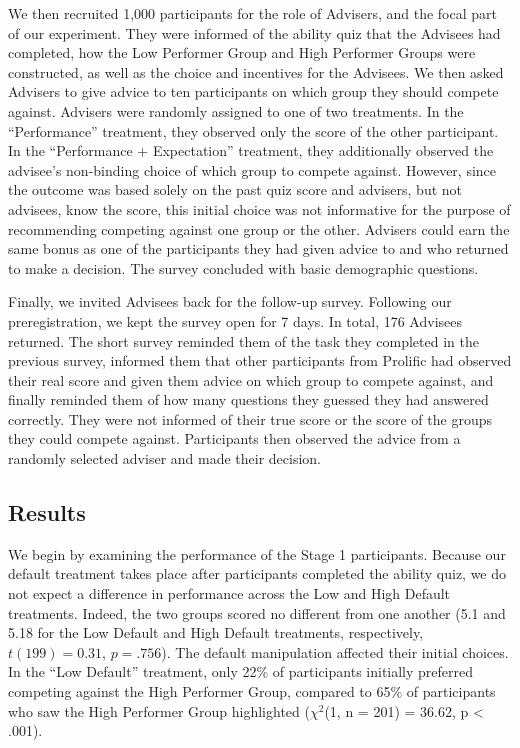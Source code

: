 \documentclass[
  man,
  floatsintext,
  longtable,
  nolmodern,
  notxfonts,
  notimes,
  colorlinks=true,linkcolor=blue,citecolor=blue,urlcolor=blue]{apa7}
\begin{document}
We then recruited 1,000 participants for the role of Advisers, and the
focal part of our experiment. They were informed of the ability quiz
that the Advisees had completed, how the Low Performer Group and High
Performer Groups were constructed, as well as the choice and incentives
for the Advisees. We then asked Advisers to give advice to ten
participants on which group they should compete against. Advisers were
randomly assigned to one of two treatments. In the ``Performance''
treatment, they observed only the score of the other participant. In the
``Performance + Expectation'' treatment, they additionally observed the
advisee's non-binding choice of which group to compete against. However,
since the outcome was based solely on the past quiz score and advisers,
but not advisees, know the score, this initial choice was not
informative for the purpose of recommending competing against one group
or the other. Advisers could earn the same bonus as one of the
participants they had given advice to and who returned to make a
decision. The survey concluded with basic demographic questions.

Finally, we invited Advisees back for the follow-up survey. Following
our preregistration, we kept the survey open for 7 days. In total, 176
Advisees returned. The short survey reminded them of the task they
completed in the previous survey, informed them that other participants
from Prolific had observed their real score and given them advice on
which group to compete against, and finally reminded them of how many
questions they guessed they had answered correctly. They were not
informed of their true score or the score of the groups they could
compete against. Participants then observed the advice from a randomly
selected adviser and made their decision.

\subsection{Results}\label{results}

We begin by examining the performance of the Stage 1 participants.
Because our default treatment takes place after participants completed
the ability quiz, we do not expect a difference in performance across
the Low and High Default treatments. Indeed, the two groups scored no
different from one another (5.1 and 5.18 for the Low Default and High
Default treatments, respectively, \(t(199) = 0.31\), \(p = .756\)). The
default manipulation affected their initial choices. In the ``Low
Default'' treatment, only 22\% of participants initially preferred
competing against the High Performer Group, compared to 65\% of
participants who saw the High Performer Group highlighted (\(\chi^2\)(1,
n = 201) = 36.62, p \textless{} .001).
\end{document}
